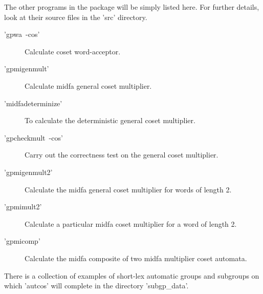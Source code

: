 The other programs in the package will be simply listed here. For
further details, look at their source files in the 'src' directory.
\begin{description}
\item['gpwa\ -cos'] Calculate coset word-acceptor.
\item['gpmigenmult'] Calculate midfa general coset multiplier.
\item['midfadeterminize'] To calculate the deterministic general coset
multiplier.
\item['gpcheckmult\ -cos'] Carry out the correctness test on the
general coset multiplier.
\item['gpmigenmult2'] Calculate the midfa general coset multiplier for words
of length 2.
\item['gpmimult2'] Calculate a particular midfa coset multiplier for a word of
length 2.
\item['gpmicomp'] Calculate the midfa composite of two midfa multiplier
coset automata.
\end{description}


There is a collection of examples of short-lex automatic groups  and subgroups
on which 'autcos' will complete in the directory 'subgp\_data'.
